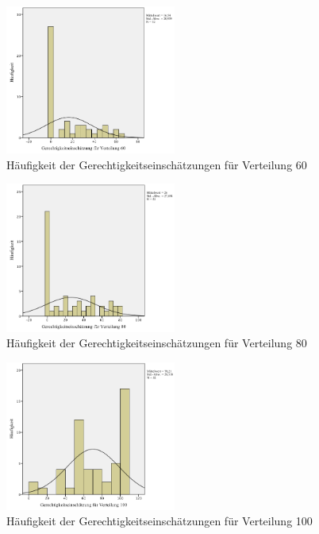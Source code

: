 \documentclass[a4paper]{thesis}
\begin{document}
\begin{figure}[H]
\centering
\includegraphics[width=0.5\textwidth]{figures/verteil_60.png}
\caption[Häufigkeit der Gerechtigkeitseinschätzungen für Verteilung 60]{Häufigkeit der Gerechtigkeitseinschätzungen für Verteilung 60}
\end{figure}

\begin{figure}[H]
\centering
\includegraphics[width=0.5\textwidth]{figures/verteil_80.png}
\caption[Häufigkeit der Gerechtigkeitseinschätzungen für Verteilung 80]{Häufigkeit der Gerechtigkeitseinschätzungen für Verteilung 80}
\end{figure}

\begin{figure}[H]
\centering
\includegraphics[width=0.5\textwidth]{figures/verteil_100.png}
\caption[Häufigkeit der Gerechtigkeitseinschätzungen für Verteilung 100]{Häufigkeit der Gerechtigkeitseinschätzungen für Verteilung 100}
\end{figure}
\end{document}
